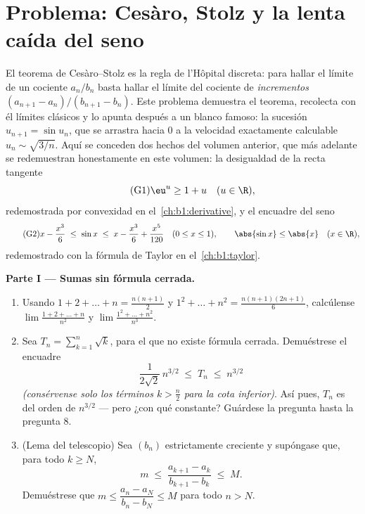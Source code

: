 \section{Problema: Cesàro, Stolz y la lenta caída del seno}

\begin{problem}[{Problema del fin de semana --- el teorema de
Cesàro--Stolz y la asintótica $u_n \sim \sqrt{3/n}$ para
$u_{n+1} = \sin u_n$}]
\label{pb:b1:seq:1}
El teorema de Cesàro--Stolz es la regla de l'Hôpital discreta: para
hallar el límite de un cociente $a_n/b_n$ basta hallar el límite del
cociente de \emph{incrementos} $(a_{n+1} - a_n)/(b_{n+1} - b_n)$. Este
problema demuestra el teorema, recolecta con él límites clásicos y lo
apunta después a un blanco famoso: la sucesión $u_{n+1} = \sin u_n$,
que se arrastra hacia $0$ a la velocidad exactamente calculable
$u_n \sim \sqrt{3/n}$. Aquí se conceden dos hechos del volumen anterior, que
más adelante se redemuestran honestamente en este volumen: la
desigualdad de la recta tangente
\[
\tag{G1} \eu^{u} \geq 1 + u \quad (u \in \R),
\]
redemostrada por convexidad en el~\cref{ch:b1:derivative}, y el
encuadre del seno
\[
\tag{G2} x - \frac{x^3}{6} \;\leq\; \sin x \;\leq\; x -
\frac{x^3}{6} + \frac{x^5}{120} \quad (0 \leq x \leq 1), \qquad
\abs{\sin x} \leq \abs{x} \quad (x \in \R),
\]
redemostrado con la fórmula de Taylor en el~\cref{ch:b1:taylor}.

\medskip
\noindent\textbf{Parte I --- Sumas sin fórmula cerrada.}
\begin{enumerate}
  \item Usando $1 + 2 + \dots + n = \frac{n(n+1)}{2}$ y
        $1^2 + \dots + n^2 = \frac{n(n+1)(2n+1)}{6}$, calcúlense
        $\lim \frac{1 + 2 + \dots + n}{n^2}$ y
        $\lim \frac{1^2 + \dots + n^2}{n^3}$.
  \item Sea $T_n = \sum_{k=1}^n \sqrt k$, para el que no existe
        fórmula cerrada. Demuéstrese el encuadre
        \[
        \frac{1}{2\sqrt 2}\,n^{3/2} \;\leq\; T_n \;\leq\;
        n^{3/2}
        \]
        \emph{(consérvense solo los términos $k > \frac n2$ para la
        cota inferior)}. Así pues, $T_n$ es del orden de $n^{3/2}$
        --- pero ¿con qué constante? Guárdese la pregunta hasta la
        pregunta 8.
  \item (Lema del telescopio) Sea $(b_n)$ estrictamente creciente y
        supóngase que, para todo $k \geq N$,
        \[
        m \;\leq\; \frac{a_{k+1} - a_k}{b_{k+1} - b_k} \;\leq\;
        M .
        \]
        Demuéstrese que $m \leq \dfrac{a_n - a_N}{b_n - b_N} \leq M$
        para todo $n > N$.
\end{enumerate}


\end{problem}
